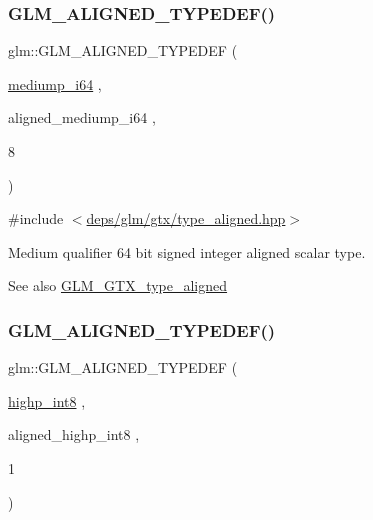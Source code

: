 \subsubsection{\texorpdfstring{G\+L\+M\+\_\+\+A\+L\+I\+G\+N\+E\+D\+\_\+\+T\+Y\+P\+E\+D\+E\+F()}{GLM\_ALIGNED\_TYPEDEF()}\hspace{0.1cm}{\footnotesize\ttfamily [24/209]}}
{\footnotesize\ttfamily glm\+::\+G\+L\+M\+\_\+\+A\+L\+I\+G\+N\+E\+D\+\_\+\+T\+Y\+P\+E\+D\+EF (\begin{DoxyParamCaption}\item[{\hyperlink{group__gtc__type__precision_ga90fedf6c701ffbe00535156715e50787}{mediump\+\_\+i64}}]{,  }\item[{aligned\+\_\+mediump\+\_\+i64}]{,  }\item[{8}]{ }\end{DoxyParamCaption})}



{\ttfamily \#include $<$\hyperlink{gtx_2type__aligned_8hpp}{deps/glm/gtx/type\+\_\+aligned.\+hpp}$>$}

Medium qualifier 64 bit signed integer aligned scalar type. \begin{DoxySeeAlso}{See also}
\hyperlink{group__gtx__type__aligned}{G\+L\+M\+\_\+\+G\+T\+X\+\_\+type\+\_\+aligned} 
\end{DoxySeeAlso}
\mbox{\label{group__gtx__type__aligned_ga56c5ca60813027b603c7b61425a0479d}} 
\subsubsection{\texorpdfstring{G\+L\+M\+\_\+\+A\+L\+I\+G\+N\+E\+D\+\_\+\+T\+Y\+P\+E\+D\+E\+F()}{GLM\_ALIGNED\_TYPEDEF()}\hspace{0.1cm}{\footnotesize\ttfamily [25/209]}}
{\footnotesize\ttfamily glm\+::\+G\+L\+M\+\_\+\+A\+L\+I\+G\+N\+E\+D\+\_\+\+T\+Y\+P\+E\+D\+EF (\begin{DoxyParamCaption}\item[{\hyperlink{group__gtc__type__precision_ga57c86999e666760c304453f9bfdc09d1}{highp\+\_\+int8}}]{,  }\item[{aligned\+\_\+highp\+\_\+int8}]{,  }\item[{1}]{ }\end{DoxyParamCaption})}



